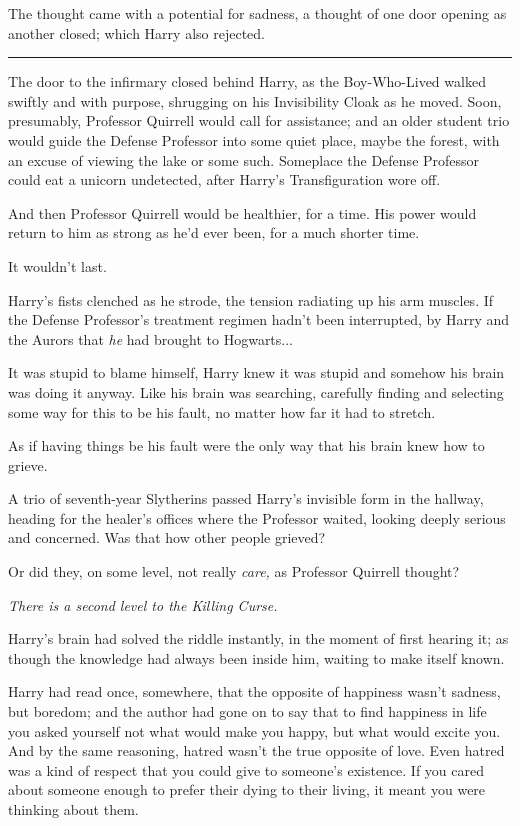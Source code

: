 The thought came with a potential for sadness, a thought of one door opening as another closed; which Harry also rejected.

\begin{center}\rule{3in}{0.4pt}\end{center}

The door to the infirmary closed behind Harry, as the Boy-Who-Lived walked swiftly and with purpose, shrugging on his Invisibility Cloak as he moved. Soon, presumably, Professor Quirrell would call for assistance; and an older student trio would guide the Defense Professor into some quiet place, maybe the forest, with an excuse of viewing the lake or some such. Someplace the Defense Professor could eat a unicorn undetected, after Harry's Transfiguration wore off.

And then Professor Quirrell would be healthier, for a time. His power would return to him as strong as he'd ever been, for a much shorter time.

It wouldn't last.

Harry's fists clenched as he strode, the tension radiating up his arm muscles. If the Defense Professor's treatment regimen hadn't been interrupted, by Harry and the Aurors that \emph{he} had brought to Hogwarts...

It was stupid to blame himself, Harry knew it was stupid and somehow his brain was doing it anyway. Like his brain was searching, carefully finding and selecting some way for this to be his fault, no matter how far it had to stretch.

As if having things be his fault were the only way that his brain knew how to grieve.

A trio of seventh-year Slytherins passed Harry's invisible form in the hallway, heading for the healer's offices where the Professor waited, looking deeply serious and concerned. Was that how other people grieved?

Or did they, on some level, not really \emph{care,} as Professor Quirrell thought?

\emph{There is a second level to the Killing Curse.}

Harry's brain had solved the riddle instantly, in the moment of first hearing it; as though the knowledge had always been inside him, waiting to make itself known.

Harry had read once, somewhere, that the opposite of happiness wasn't sadness, but boredom; and the author had gone on to say that to find happiness in life you asked yourself not what would make you happy, but what would excite you. And by the same reasoning, hatred wasn't the true opposite of love. Even hatred was a kind of respect that you could give to someone's existence. If you cared about someone enough to prefer their dying to their living, it meant you were thinking about them.

